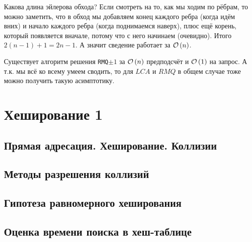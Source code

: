 \begin{note}
Какова длина эйлерова обхода? Если смотреть на то, как мы ходим по рёбрам, то можно заметить, что в обход мы добавляем конец каждого ребра (когда идём вних) и начало каждого ребра (когда поднимаемся наверх), плюс ещё корень, который появляется вначале, потому что с него начинаем (очевидно). Итого $2(n-1)+1 = 2n-1$. А значит сведение работает за $\mathcal{O}\left(n\right)$.
\end{note}
\begin{note}
Существует алгоритм решения \texttt{RMQ$\pm 1$} за $\mathcal{O}\left(n\right)$ предподсчёт и $\mathcal{O}\left(1\right)$ на запрос. А т.к. мы всё ко всему умеем сводить, то для $LCA$ и $RMQ$ в общем случае тоже можно получить такую асимптотику.
\end{note}

\section{Хеширование 1}
\subsection{Прямая адресация. Хеширование. Коллизии}
\subsection{Методы разрешения коллизий}
\subsection{Гипотеза равномерного хеширования}
\subsection{Оценка времени поиска в хеш-таблице}

